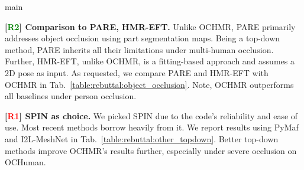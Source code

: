 main\documentclass[10pt,twocolumn,letterpaper]{article}
\newcommand{\Rone}{\textcolor{Red}{R1}}
\newcommand{\Rtwo}{\textcolor{Green}{R2}}
\begin{document}
\begin{table}[b]
\vspace*{-0.2in}
\captionsetup{font=scriptsize}
\centering
\small
{}
\vspace*{-0.1in}
\caption{We report MPJPE/AP of methods under person and object occlusion. Evaluations are done using ground-truth boxes. HMR-EFT uses AlphaPose for 2D pose.}
\label{table:rebuttal:object_occlusion}
\vspace*{-0.5in}
\end{table}
 
\vspace{1.0mm}\noindent
\textbf{[\Rtwo] Comparison to PARE, HMR-EFT.} Unlike OCHMR, PARE primarily addresses object occlusion using part segmentation maps. Being a top-down method, PARE inherits all their limitations under multi-human occlusion. Further, HMR-EFT, unlike OCHMR, is a fitting-based approach and assumes a 2D pose as input. As requested, we compare PARE and HMR-EFT with OCHMR in Tab.~\ref{table:rebuttal:object_occlusion}. Note, OCHMR outperforms all baselines under person occlusion.


\vspace{1.0mm}\noindent
\textbf{[\Rone] SPIN as choice.} We picked SPIN due to the code's reliability and ease of use. Most recent methods borrow heavily from it. We report results using PyMaf and I2L-MeshNet in Tab.~\ref{table:rebuttal:other_topdown}. Better top-down methods improve OCHMR's results further, especially under severe occlusion on OCHuman.
\end{document}
